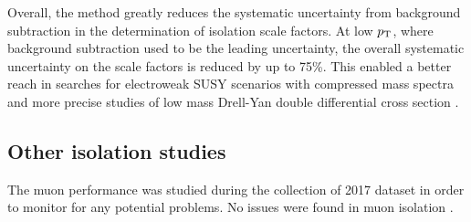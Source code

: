 Overall, the method greatly reduces the systematic uncertainty from
background subtraction in the determination of isolation scale factors.
At low $p_{\text{T}}$, where background subtraction used to be the leading
uncertainty, the overall systematic uncertainty on the scale factors
is reduced by up to 75\%. This enabled a better reach in searches for
electroweak SUSY scenarios with compressed mass spectra
\cite{PhysRevD.97.052010} and more precise studies of low mass
Drell-Yan double differential cross section \cite{Giuli:2681125}.

\subsection{Other isolation studies}

The muon performance was studied during the collection of 2017 dataset
in order to monitor for any potential problems. No issues were 
found in muon isolation \cite{Bellomo:2282672}.

